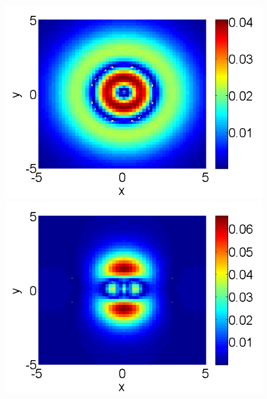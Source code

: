 \documentclass[a4paper]{article}
\theoremstyle{remark}
\begin{document}
\begin{large}
\begin{figure}[htbp]
\begin{minipage}[b]{0.48\linewidth}
	\end{minipage}
	\begin{minipage}[b]{0.48\linewidth}
		 \raggedright
		\includegraphics[width=\linewidth]{BestFitVsSimpleIter/ChristovIC_50_bt1_c010_h02_O(h^6).png}
	\end{minipage}
	\begin{minipage}[b]{0.48\linewidth}
		\raggedleft
		 \includegraphics[width=\linewidth]{BestFitVsSimpleIter/ChristovIC_50_bt3_c017_h02_O(h^6).png}
	\end{minipage}
	\begin{minipage}[b]{0.48\linewidth}
		\raggedright

\end{minipage}
\end{figure}
\end{large}
\end{document}
